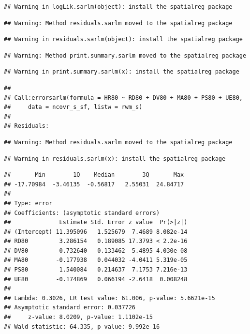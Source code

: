 \documentclass[]{book}
\begin{document}
\begin{verbatim}
## Warning in logLik.sarlm(object): install the spatialreg package
\end{verbatim}

\begin{verbatim}
## Warning: Method residuals.sarlm moved to the spatialreg package
\end{verbatim}

\begin{verbatim}
## Warning in residuals.sarlm(object): install the spatialreg package
\end{verbatim}

\begin{verbatim}
## Warning: Method print.summary.sarlm moved to the spatialreg package
\end{verbatim}

\begin{verbatim}
## Warning in print.summary.sarlm(x): install the spatialreg package
\end{verbatim}

\begin{verbatim}
## 
## Call:errorsarlm(formula = HR80 ~ RD80 + DV80 + MA80 + PS80 + UE80, 
##     data = ncovr_s_sf, listw = rwm_s)
## 
## Residuals:
\end{verbatim}

\begin{verbatim}
## Warning: Method residuals.sarlm moved to the spatialreg package
\end{verbatim}

\begin{verbatim}
## Warning in residuals.sarlm(x): install the spatialreg package
\end{verbatim}

\begin{verbatim}
##       Min        1Q    Median        3Q       Max 
## -17.70984  -3.46135  -0.56817   2.55031  24.84717 
## 
## Type: error 
## Coefficients: (asymptotic standard errors) 
##              Estimate Std. Error z value  Pr(>|z|)
## (Intercept) 11.395096   1.525679  7.4689 8.082e-14
## RD80         3.286154   0.189085 17.3793 < 2.2e-16
## DV80         0.732640   0.133462  5.4895 4.030e-08
## MA80        -0.177938   0.044032 -4.0411 5.319e-05
## PS80         1.540084   0.214637  7.1753 7.216e-13
## UE80        -0.174869   0.066194 -2.6418  0.008248
## 
## Lambda: 0.3026, LR test value: 61.006, p-value: 5.6621e-15
## Asymptotic standard error: 0.037726
##     z-value: 8.0209, p-value: 1.1102e-15
## Wald statistic: 64.335, p-value: 9.992e-16
\end{verbatim}
\end{document}
